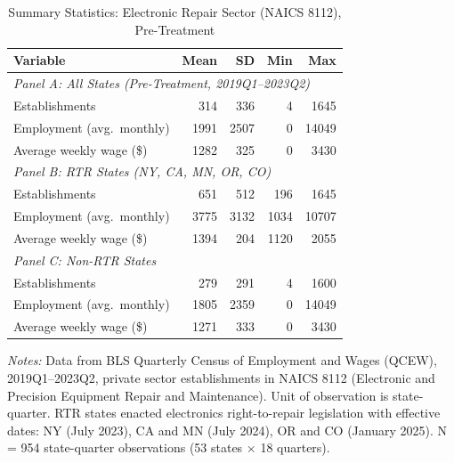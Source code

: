 \begin{table}[H]
\centering
\caption{Summary Statistics: Electronic Repair Sector (NAICS 8112), Pre-Treatment}
\label{tab:summary}
\begin{threeparttable}
\begin{tabular}{lrrrr}
\toprule
Variable & Mean & SD & Min & Max \\
\midrule
\multicolumn{5}{l}{\textit{Panel A: All States (Pre-Treatment, 2019Q1--2023Q2)}} \\
Establishments & 314 & 336 & 4 & 1645 \\
Employment (avg.\ monthly) & 1991 & 2507 & 0 & 14049 \\
Average weekly wage (\$) & 1282 & 325 & 0 & 3430 \\
\midrule
\multicolumn{5}{l}{\textit{Panel B: RTR States (NY, CA, MN, OR, CO)}} \\
Establishments & 651 & 512 & 196 & 1645 \\
Employment (avg.\ monthly) & 3775 & 3132 & 1034 & 10707 \\
Average weekly wage (\$) & 1394 & 204 & 1120 & 2055 \\
\midrule
\multicolumn{5}{l}{\textit{Panel C: Non-RTR States}} \\
Establishments & 279 & 291 & 4 & 1600 \\
Employment (avg.\ monthly) & 1805 & 2359 & 0 & 14049 \\
Average weekly wage (\$) & 1271 & 333 & 0 & 3430 \\
\bottomrule
\end{tabular}
\begin{tablenotes}[flushleft]
\small
\item \textit{Notes:} Data from BLS Quarterly Census of Employment and Wages (QCEW), 2019Q1--2023Q2, private sector establishments in NAICS 8112 (Electronic and Precision Equipment Repair and Maintenance). Unit of observation is state-quarter. RTR states enacted electronics right-to-repair legislation with effective dates: NY (July 2023), CA and MN (July 2024), OR and CO (January 2025). N = 954 state-quarter observations (53 states $\times$ 18 quarters).
\end{tablenotes}
\end{threeparttable}
\end{table}
